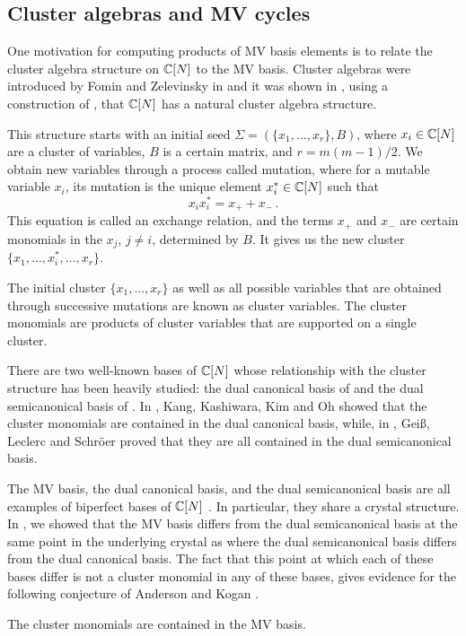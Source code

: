 \documentclass{article}
\begin{document}
\subsection{Cluster algebras and MV cycles}
One motivation for computing products of MV basis elements is to relate the cluster algebra structure on $\mathbb C[N]$ to the MV basis. Cluster algebras were introduced by Fomin and Zelevinsky in \cite{fomin2002cluster1} and it was shown in \cite{geiss2007initial}, using a construction of \cite{berenstein2005cluster3}, that $\mathbb C[N]$ has a natural cluster algebra structure. 

This structure starts with an initial seed $\Sigma = (\{x_1,\dots,x_r\},B)$, where $x_i \in \mathbb C[N]$ are a cluster of variables, $B$ is a certain matrix, and $ r = m(m-1)/2$.
We obtain new variables through a process called mutation, where for a mutable variable $x_i$, its mutation is the unique element $x_i^* \in \mathbb C[N]$ such that 
$$
    x_ix_i^* = x_+ + x_- \,.
$$
This equation is called an exchange relation, and the terms $x_+$ and $x_-$ are certain monomials in the $x_j$, $j\neq i$,  determined by $B$. 
It gives us the new cluster $\{x_1, \dots, x_i^*, \dots, x_r\}$. 

The initial cluster $\{x_1,\dots,x_r\}$ as well as all possible variables that are obtained through successive mutations are known as cluster variables. 
The cluster monomials are products of cluster variables that are supported on a single cluster. 

There are two well-known bases of $\mathbb C[N]$ whose relationship with the cluster structure has been heavily studied: the dual canonical basis of \cite{lusztig1990canonicalbases} and the dual semicanonical basis of \cite{lusztig2000semicanonical}.
In \cite{kang2018monoidal}, Kang, Kashiwara, Kim and Oh showed that the cluster monomials are contained in the dual canonical basis, while, in \cite{geiss2006rigid}, Gei\ss, Leclerc and Schr\"oer proved that they are all contained in the dual semicanonical basis.
%  

The MV basis, the dual canonical basis, and the dual semicanonical basis are all examples of biperfect bases of $\mathbb C[N]$ \cite[Section 2]{baumann2019mirkovic}. In particular, they share a crystal structure.
In \cite[Appendix]{baumann2019mirkovic}, we showed that the MV basis differs from the dual semicanonical basis at the same point in the underlying crystal as where the dual semicanonical basis differs from the dual canonical basis.  
% 
The fact that this point at which each of these bases differ is not a cluster monomial in any of these bases, gives evidence for the following conjecture of Anderson and Kogan \cite[Conjecture 5.1]{anderson2006algebra}.
\begin{conjecture}\label{conj:cluster in MV}
    The cluster monomials are contained in the MV basis. 
\end{conjecture}
\end{document}
